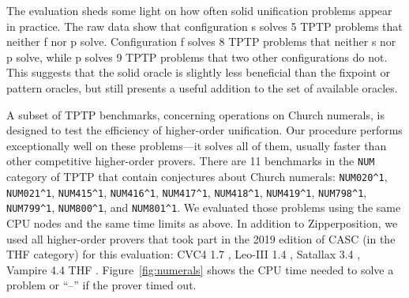 The evaluation sheds some light on how often solid unification problems appear in practice. 
The raw data show that
configuration s solves 5 TPTP problems that neither f nor p solve. Configuration
f solves 8 TPTP problems that neither s nor p solve, while p solves 9 TPTP
problems that two other configurations do not. This suggests that the solid oracle
is slightly less beneficial than the fixpoint or pattern oracles, but still presents a
useful addition to the set of available oracles.

A subset of TPTP benchmarks, concerning operations on Church numerals, is designed to test the efficiency of
higher-order unification. Our procedure performs exceptionally well
on these problems---it solves all of them, usually
faster than other competitive higher-order provers.
  There are 11 benchmarks in the \texttt{NUM} category of TPTP that contain conjectures about
  Church numerals: \texttt{NUM020\^{}1}, \texttt{NUM021\^{}1}, \texttt{NUM415\^{}1},
  \texttt{NUM416\^{}1}, \texttt{NUM417\^{}1}, \texttt{NUM418\^{}1}, \texttt{NUM419\^{}1}, \texttt{NUM798\^{}1},
  \texttt{NUM799\^{}1}, \texttt{NUM800\^{}1}, and \texttt{NUM801\^{}1}.
  We evaluated those problems using the same CPU nodes and the same time limits 
  as above. In addition to Zipperposition, we used
  all higher-order provers that took part in the 2019 edition of CASC \cite{gs-19-casc27} (in the THF category) for this evaluation: CVC4
  1.7 \cite{cbetal-11-cvc4}, Leo-III 1.4 \cite{sb-21-leo3}, Satallax 3.4
  \cite{cb-12-satallax}, Vampire 4.4 THF \cite{lkav-13-vampire}. Figure~\ref{fig:numerals}
  shows the CPU time needed to solve a problem or ``--'' if the prover timed out.
  \pagebreak[2]

